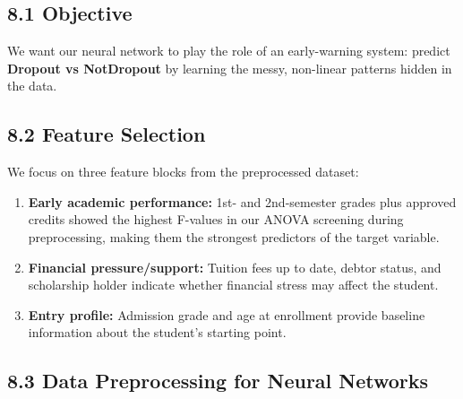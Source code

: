 \documentclass[
]{article}
\providecommand{\tightlist}{%
  \setlength{\itemsep}{0pt}\setlength{\parskip}{0pt}}
\begin{document}
\subsection{8.1 Objective}\label{objective}

We want our neural network to play the role of an early-warning system:
predict \textbf{Dropout vs NotDropout} by learning the messy, non-linear
patterns hidden in the data.

\subsection{8.2 Feature Selection}\label{feature-selection}

We focus on three feature blocks from the preprocessed dataset:

\begin{enumerate}
\def\labelenumi{\arabic{enumi}.}
\tightlist
\item
  \textbf{Early academic performance:} 1st- and 2nd-semester grades plus
  approved credits showed the highest F-values in our ANOVA screening
  during preprocessing, making them the strongest predictors of the
  target variable.
\item
  \textbf{Financial pressure/support:} Tuition fees up to date, debtor
  status, and scholarship holder indicate whether financial stress may
  affect the student.
\item
  \textbf{Entry profile:} Admission grade and age at enrollment provide
  baseline information about the student's starting point.
\end{enumerate}

\subsection{8.3 Data Preprocessing for Neural
Networks}\label{data-preprocessing-for-neural-networks}
\end{document}
